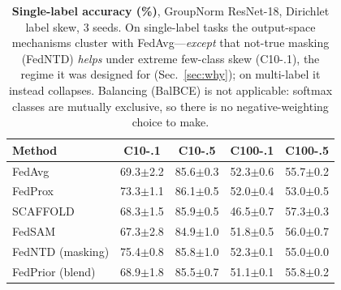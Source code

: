 \begin{table}[t]
\centering\small\setlength{\tabcolsep}{3pt}
\caption{\textbf{Single-label accuracy (\%)}, GroupNorm ResNet-18, Dirichlet label skew, 3 seeds. On single-label tasks the output-space mechanisms cluster with FedAvg---\emph{except} that not-true masking (FedNTD) \emph{helps} under extreme few-class skew (C10-.1), the regime it was designed for (Sec.~\ref{sec:why}); on multi-label it instead collapses. Balancing (BalBCE) is not applicable: softmax classes are mutually exclusive, so there is no negative-weighting choice to make.}
\label{tab:sl}
\begin{tabular}{lcccc}
\toprule
Method & C10-.1 & C10-.5 & C100-.1 & C100-.5 \\
\midrule
FedAvg & 69.3\tiny$\pm$2.2 & 85.6\tiny$\pm$0.3 & 52.3\tiny$\pm$0.6 & 55.7\tiny$\pm$0.2 \\
FedProx & 73.3\tiny$\pm$1.1 & 86.1\tiny$\pm$0.5 & 52.0\tiny$\pm$0.4 & 53.0\tiny$\pm$0.5 \\
SCAFFOLD & 68.3\tiny$\pm$1.5 & 85.9\tiny$\pm$0.5 & 46.5\tiny$\pm$0.7 & 57.3\tiny$\pm$0.3 \\
FedSAM & 67.3\tiny$\pm$2.8 & 84.9\tiny$\pm$1.0 & 51.8\tiny$\pm$0.5 & 56.0\tiny$\pm$0.7 \\
FedNTD (masking) & 75.4\tiny$\pm$0.8 & 85.8\tiny$\pm$1.0 & 52.3\tiny$\pm$0.1 & 55.0\tiny$\pm$0.0 \\
FedPrior (blend) & 68.9\tiny$\pm$1.8 & 85.5\tiny$\pm$0.7 & 51.1\tiny$\pm$0.1 & 55.8\tiny$\pm$0.2 \\
\bottomrule
\end{tabular}
\end{table}

